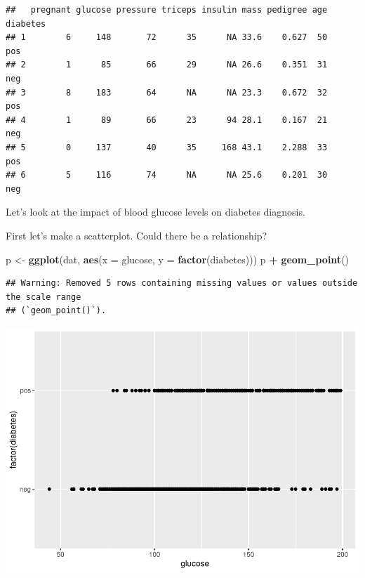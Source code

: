 \documentclass[
]{book}
\newenvironment{Shaded}{\begin{snugshade}}{\end{snugshade}}
\newcommand{\AttributeTok}[1]{\textcolor[rgb]{0.13,0.29,0.53}{#1}}
\newcommand{\FunctionTok}[1]{\textcolor[rgb]{0.13,0.29,0.53}{\textbf{#1}}}
\newcommand{\NormalTok}[1]{#1}
\newcommand{\OtherTok}[1]{\textcolor[rgb]{0.56,0.35,0.01}{#1}}
\newcommand{\SpecialCharTok}[1]{\textcolor[rgb]{0.81,0.36,0.00}{\textbf{#1}}}
\begin{document}
\begin{verbatim}
##   pregnant glucose pressure triceps insulin mass pedigree age diabetes
## 1        6     148       72      35      NA 33.6    0.627  50      pos
## 2        1      85       66      29      NA 26.6    0.351  31      neg
## 3        8     183       64      NA      NA 23.3    0.672  32      pos
## 4        1      89       66      23      94 28.1    0.167  21      neg
## 5        0     137       40      35     168 43.1    2.288  33      pos
## 6        5     116       74      NA      NA 25.6    0.201  30      neg
\end{verbatim}

Let's look at the impact of blood glucose levels on diabetes diagnosis.

First let's make a scatterplot. Could there be a relationship?

\begin{Shaded}
\begin{Highlighting}[]
\NormalTok{p }\OtherTok{\textless{}{-}} \FunctionTok{ggplot}\NormalTok{(dat, }\FunctionTok{aes}\NormalTok{(}\AttributeTok{x =}\NormalTok{ glucose, }\AttributeTok{y =} \FunctionTok{factor}\NormalTok{(diabetes)))}
\NormalTok{p }\SpecialCharTok{+} \FunctionTok{geom\_point}\NormalTok{()}
\end{Highlighting}
\end{Shaded}

\begin{verbatim}
## Warning: Removed 5 rows containing missing values or values outside the scale range
## (`geom_point()`).
\end{verbatim}

\includegraphics{_main_files/figure-latex/plot-diabetes-vs-glucose-1.pdf}
\end{document}
